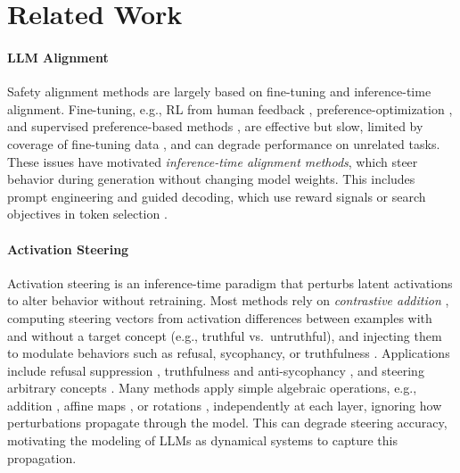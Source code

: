 \documentclass{article}
\theoremstyle{plain}
\theoremstyle{definition}
\theoremstyle{remark}
\begin{document}
\vspace{-17pt}
\section{Related Work}

\paragraph{LLM Alignment} Safety alignment methods are largely based on fine-tuning and inference-time alignment. Fine-tuning, e.g., RL from human feedback \cite{stiennon2020learning, touvron2023llama}, preference-optimization \cite{rafailov2023direct, xu2024contrastive}, and supervised preference-based methods \cite{yuan2023rrhf, song2024preference}, are effective but slow, limited by coverage of fine-tuning data \cite{houlsby2019parameter}, and can degrade performance on unrelated tasks. These issues have motivated \emph{inference-time alignment methods}, which steer behavior during generation without changing model weights. This includes prompt engineering \cite{askell2021general, zhang2023defending} and guided decoding, which use reward signals or search objectives in token selection \cite{khanov2024args, huang2025deal}.


\vspace{-8pt}
\paragraph{Activation Steering} Activation steering is an inference-time paradigm \cite{zou2023representation, lee2025programming} that perturbs latent activations to alter behavior without retraining. Most methods rely on \emph{contrastive addition} \cite{Dathathri2020Plug}, computing steering vectors from activation differences between examples with and without a target concept (e.g., truthful vs.\ untruthful), and injecting them to modulate behaviors such as refusal, sycophancy, or truthfulness \cite{li2023inference, turner2024activation}. Applications include refusal suppression \cite{Arditi_Obeso_Syed_Paleka_Panickssery_Gurnee_Nanda_2024a}, truthfulness and anti-sycophancy \cite{Rimsky_Gabrieli_Schulz_Tong_Hubinger_Turner_2024, Li_Patel_Viégas_Pfister_Wattenberg_2024}, and steering arbitrary concepts \cite{Turner_Thiergart_Leech_Udell_Vazquez_Mini_MacDiarmid_2024}.
Many methods apply simple algebraic operations, e.g., addition \cite{Turner_Thiergart_Leech_Udell_Vazquez_Mini_MacDiarmid_2024}, affine maps \cite{Rodriguez_Blaas_Klein_Zappella_Apostoloff_Cuturi_Suau_2024, wu2024reft, wu2024advancing}, or rotations \cite{Vu_Nguyen_2025}, independently at each layer, ignoring how perturbations propagate through the model. This can degrade steering accuracy, motivating the modeling of LLMs as dynamical systems \cite{bhargava2023s} to capture this propagation.  
\end{document}
